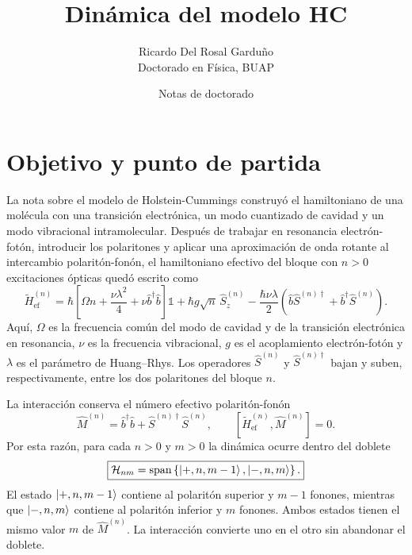 \documentclass[11pt]{article}
\title{Din\'amica del modelo HC}
\author{Ricardo Del Rosal Gardu\~no \\ \small Doctorado en F\'isica, BUAP}
\date{Notas de doctorado}
\newcommand{\bdag}{\hat b^\dagger}
\newcommand{\Id}{\mathds{1}}
\begin{document}
\maketitle

\tableofcontents
\bigskip

\section{Objetivo y punto de partida}

La nota sobre el modelo de Holstein-Cummings construy\'o el hamiltoniano de una
mol\'ecula con una transici\'on electr\'onica, un modo cuantizado de cavidad y
un modo vibracional intramolecular. Despu\'es de trabajar en resonancia
electr\'on-fot\'on, introducir los polaritones y aplicar una aproximaci\'on de
onda rotante al intercambio polarit\'on-fon\'on, el hamiltoniano efectivo del
bloque con $n>0$ excitaciones \'opticas qued\'o escrito como
\begin{equation}
  \boxed{
  \tilde H_{\mathrm{ef}}^{(n)}
  =
  \hbar
  \left[
  \Omega n+\frac{\nu\lambda^2}{4}
  +
  \nu\bdag\hat b
  \right]\Id
  +
  \hbar g\sqrt n\,\hat S_z^{(n)}
  -
  \frac{\hbar\nu\lambda}{2}
  \left(
  \hat b\hat S^{(n)\dagger}
  +
  \bdag\hat S^{(n)}
  \right).
  }
\end{equation}
Aqu\'i, $\Omega$ es la frecuencia com\'un del modo de cavidad y de la
transici\'on electr\'onica en resonancia, $\nu$ es la frecuencia vibracional,
$g$ es el acoplamiento electr\'on-fot\'on y $\lambda$ es el par\'ametro de
Huang--Rhys. Los operadores $\hat S^{(n)}$ y $\hat S^{(n)\dagger}$ bajan y
suben, respectivamente, entre los dos polaritones del bloque $n$.

La interacci\'on conserva el n\'umero efectivo polarit\'on-fon\'on
\begin{equation}
  \boxed{
  \hat M^{(n)}
  =
  \bdag\hat b+\hat S^{(n)\dagger}\hat S^{(n)},
  \qquad
  [\tilde H_{\mathrm{ef}}^{(n)},\hat M^{(n)}]=0.
  }
\end{equation}
Por esta raz\'on, para cada $n>0$ y $m>0$ la din\'amica ocurre dentro del
doblete
\begin{equation}
  \boxed{
  \mathcal H_{nm}
  =
  \operatorname{span}
  \left\{
  \ket{+,n,m-1},
  \ket{-,n,m}
  \right\}.
  }
\end{equation}
El estado $\ket{+,n,m-1}$ contiene al polarit\'on superior y $m-1$ fonones,
mientras que $\ket{-,n,m}$ contiene al polarit\'on inferior y $m$ fonones.
Ambos estados tienen el mismo valor $m$ de $\hat M^{(n)}$. La interacci\'on
convierte uno en el otro sin abandonar el doblete.
\end{document}
